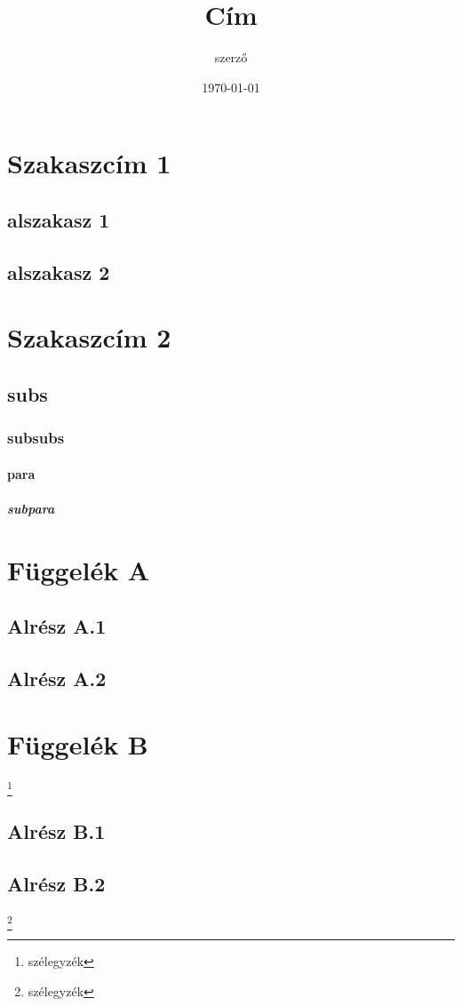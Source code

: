 \documentclass[twoside]{book}
\begin{document}
\title{Cím}
\author{szerző}
\date{\today}
\maketitle
\frontmatter
\tableofcontents
\clearpage
\hulipsum[4]
\mainmatter
\section[szc]{Szakaszcím 1}
\subsection{alszakasz 1}
\hulipsum[2]
\subsection{alszakasz 2}
\hulipsum[3]
\section{Szakaszcím 2}
\subsection{subs}
\subsubsection{subsubs}
\paragraph{para}
\subparagraph{subpara}
\appendix
\section{Függelék A}
\subsection{Alrész A.1}
\subsection{Alrész A.2}
\section{Függelék B}
\footnote{szélegyzék}
\subsection{Alrész B.1}
\subsection{Alrész B.2}
\footnote{szélegyzék}
\end{document}
